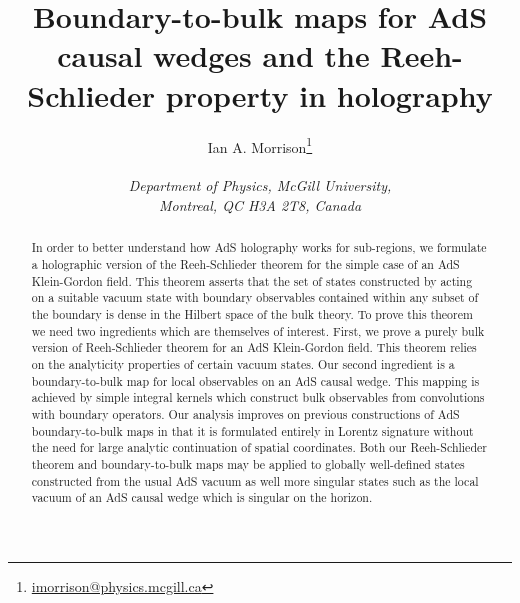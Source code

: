 \documentclass[12pt]{article}
\numberwithin{equation}{section}
\begin{document}

\title{Boundary-to-bulk maps for AdS causal wedges
and the Reeh-Schlieder property in holography}

\author{Ian A. Morrison\thanks{
    \href{mailto:imorrison@physics.mcgill.ca}
    {imorrison@physics.mcgill.ca}
  }
  \\ \\
  {\it Department of Physics, McGill University, } \\
  {\it Montreal, QC H3A 2T8, Canada }
}

\maketitle


\begin{abstract}
  In order to better understand how AdS holography works for
  sub-regions, we formulate a holographic version of the Reeh-Schlieder 
  theorem for the simple case of an AdS Klein-Gordon field.
  This theorem asserts that the set of states constructed by acting 
  on a suitable vacuum state with boundary observables contained
  within any subset of the boundary is dense in the Hilbert space 
  of the bulk theory.
  To prove this theorem we need two ingredients which are themselves
  of interest. First, we prove a purely bulk version of Reeh-Schlieder
  theorem for an AdS Klein-Gordon field. This theorem relies on the 
  analyticity properties of certain vacuum states.
  Our second ingredient is a boundary-to-bulk map for local observables
  on an AdS causal wedge.
  This mapping is achieved by simple integral kernels
  which construct bulk observables from convolutions with 
  boundary operators.
  Our analysis improves on previous constructions of AdS boundary-to-bulk
  maps in that it is formulated entirely in Lorentz signature 
  without the need for large analytic continuation of spatial coordinates.
  Both our Reeh-Schlieder theorem and boundary-to-bulk maps
  may be applied to globally well-defined states
  constructed from the usual AdS vacuum as well more
  singular states such as the local vacuum of an AdS causal wedge
  which is singular on the horizon.
\end{abstract}
\end{document}
